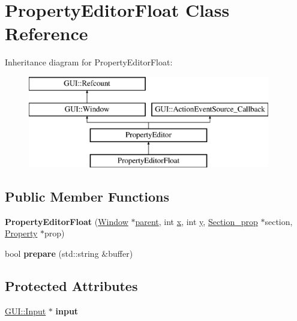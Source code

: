 \hypertarget{classPropertyEditorFloat}{\section{Property\-Editor\-Float Class Reference}
\label{classPropertyEditorFloat}
}
Inheritance diagram for Property\-Editor\-Float\-:\begin{figure}[H]
\begin{center}
\leavevmode
\includegraphics[height=4.000000cm]{classPropertyEditorFloat}
\end{center}
\end{figure}
\subsection*{Public Member Functions}
\begin{DoxyCompactItemize}
\item 
\hypertarget{classPropertyEditorFloat_a802ab5b49e83b39a3bafd825f7423f6f}{{\bfseries Property\-Editor\-Float} (\hyperlink{classGUI_1_1Window_ae828e9daa964dfc65a3550fb03117d30}{Window} $\ast$\hyperlink{classGUI_1_1Window_a2e593ff65e7702178d82fe9010a0b539}{parent}, int \hyperlink{classGUI_1_1Window_a6ca6a80ca00c9e1d8ceea8d3d99a657d}{x}, int \hyperlink{classGUI_1_1Window_a0ee8e923aff2c3661fc2e17656d37adf}{y}, \hyperlink{classSection__prop}{Section\-\_\-prop} $\ast$section, \hyperlink{classProperty}{Property} $\ast$prop)}\label{classPropertyEditorFloat_a802ab5b49e83b39a3bafd825f7423f6f}

\item 
\hypertarget{classPropertyEditorFloat_adbc9db52bdfd97df5ec2f62d3a59db87}{bool {\bfseries prepare} (std\-::string \&buffer)}\label{classPropertyEditorFloat_adbc9db52bdfd97df5ec2f62d3a59db87}

\end{DoxyCompactItemize}
\subsection*{Protected Attributes}
\begin{DoxyCompactItemize}
\item 
\hypertarget{classPropertyEditorFloat_a84a33b96ef3bd08106b7ab4aa8ef7039}{\hyperlink{classGUI_1_1Input}{G\-U\-I\-::\-Input} $\ast$ {\bfseries input}}\label{classPropertyEditorFloat_a84a33b96ef3bd08106b7ab4aa8ef7039}

\end{DoxyCompactItemize}


